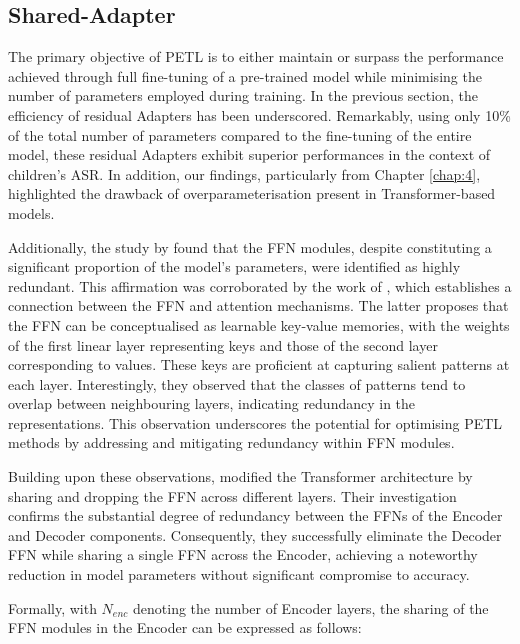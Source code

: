\subsection{Shared-Adapter}
The primary objective of \ac{PETL} is to either maintain or surpass the performance achieved through full fine-tuning of a pre-trained model while minimising the number of parameters employed during training. In the previous section, the efficiency of residual Adapters has been underscored. Remarkably, using only 10\% of the total number of parameters compared to the fine-tuning of the entire model, these residual Adapters exhibit superior performances in the context of children's \ac{ASR}. In addition, our findings, particularly from Chapter \ref{chap:4},  highlighted the drawback of overparameterisation present in Transformer-based models.

Additionally, the study by \cite{pires2023one} found that the \ac{FFN} modules, despite constituting a significant proportion of the model's parameters, were identified as highly redundant. This affirmation was corroborated by the work of \cite{geva2020transformer}, which establishes a connection between the \ac{FFN} and attention mechanisms. The latter proposes that the \ac{FFN} can be conceptualised as learnable key-value memories, with the weights of the first linear layer representing keys and those of the second layer corresponding to values. These keys are proficient at capturing salient patterns at each layer. Interestingly, they observed that the classes of patterns tend to overlap between neighbouring layers, indicating redundancy in the representations. This observation underscores the potential for optimising \ac{PETL} methods by addressing and mitigating redundancy within \ac{FFN} modules.

Building upon these observations, \cite{pires2023one} modified the Transformer architecture by sharing and dropping the \ac{FFN} across different layers. Their investigation confirms the substantial degree of redundancy between the \acp{FFN} of the Encoder and Decoder components. Consequently, they successfully eliminate the Decoder \ac{FFN} while sharing a single \ac{FFN} across the Encoder, achieving a noteworthy reduction in model parameters without significant compromise to accuracy.

Formally, with $N_{enc}$ denoting the number of Encoder layers, the sharing of the \ac{FFN} modules in the Encoder can be expressed as follows:

